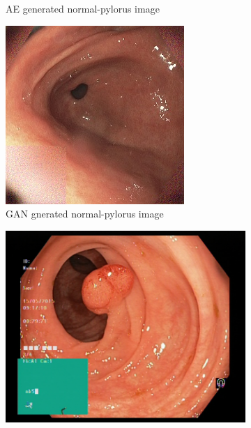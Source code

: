 \begin{figure}
\begin{subfigure}[t]{\myfigsizethree}
            \caption{AE generated normal-pylorus image}    
            \label{fig:np_AE_both1}
        \end{subfigure}
        \qquad
        \begin{subfigure}[t]{\myfigsizethree}  
            \centering 
            \includegraphics[width=\textwidth]{experiments/figures/both/NPGAN.jpg}
            \caption{GAN gnerated normal-pylorus image}    
            \label{fig:np_GAN_both1}
        \end{subfigure}
        \qquad\vfill%
        \begin{subfigure}[t]{\myfigsizethree}   
            \centering 
            \includegraphics[height=\textwidth ,width=\textwidth]{experiments/figures/both/PORIG.jpg}

\end{subfigure}
\end{figure}
